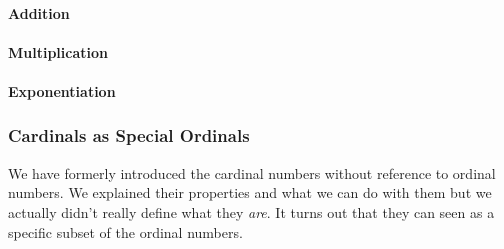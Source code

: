 \paragraph{Addition}



\paragraph{Multiplication}

\paragraph{Exponentiation}




\subsubsection{Cardinals as Special Ordinals}
We have formerly introduced the cardinal numbers without reference to ordinal numbers. We explained their properties and what we can do with them but we actually didn't really define what they \emph{are}. It turns out that they can seen as a specific subset of the ordinal numbers.


